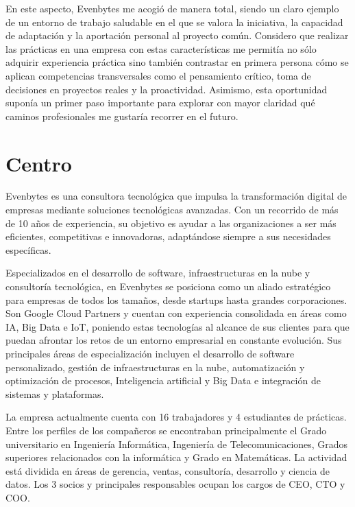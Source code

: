 En este aspecto, Evenbytes me acogió de manera total, siendo un claro ejemplo de un entorno de trabajo saludable en el que se valora la iniciativa, la capacidad de adaptación y la aportación personal al proyecto común. Considero que realizar las prácticas en una empresa con estas características me permitía no sólo adquirir experiencia práctica sino también contrastar en primera persona cómo se aplican competencias transversales como el pensamiento crítico, toma de decisiones en proyectos reales y la proactividad. Asimismo, esta oportunidad suponía un primer paso importante para explorar con mayor claridad qué caminos profesionales me gustaría recorrer en el futuro.
%
%
\section{Centro} \label{centro}
%
%
Evenbytes es una consultora tecnológica que impulsa la transformación digital de empresas mediante soluciones tecnológicas avanzadas. Con un recorrido de más de 10 años de experiencia, su objetivo es ayudar a las organizaciones a ser más eficientes, competitivas e innovadoras, adaptándose siempre a sus necesidades específicas.

Especializados en el desarrollo de software, infraestructuras en la nube y consultoría tecnológica, en Evenbytes se posiciona como un aliado estratégico para empresas de todos los tamaños, desde startups hasta grandes corporaciones. Son Google Cloud Partners y cuentan con experiencia consolidada en áreas como IA, Big Data e IoT, poniendo estas tecnologías al alcance de sus clientes para que puedan afrontar los retos de un entorno empresarial en constante evolución. Sus principales áreas de especialización incluyen el desarrollo de software personalizado, gestión de infraestructuras en la nube, automatización y optimización de procesos, Inteligencia artificial y Big Data e integración de sistemas y plataformas.

La empresa actualmente cuenta con 16 trabajadores y 4 estudiantes de prácticas. Entre los perfiles de los compañeros se encontraban principalmente el Grado universitario en Ingeniería Informática, Ingeniería de Telecomunicaciones, Grados superiores relacionados con la informática y Grado en Matemáticas. La actividad está dividida en áreas de gerencia, ventas, consultoría, desarrollo y ciencia de datos. Los 3 socios y principales responsables ocupan los cargos de CEO, CTO y COO.

%
%
